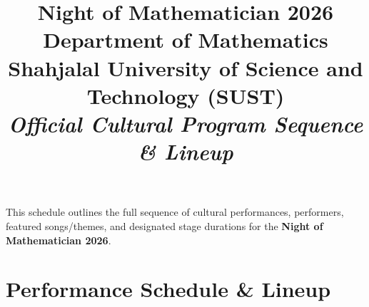 \documentclass[11pt,a4paper]{article}
\title{
    \vspace{-1.5cm}
    \LARGE \textbf{Night of Mathematician 2026} \\
    \large \textbf{Department of Mathematics} \\
    \large \textbf{Shahjalal University of Science and Technology (SUST)} \\[0.3em]
    \normalsize \textit{Official Cultural Program Sequence \& Lineup}
    \vspace{-0.5cm}
}
\date{}
\begin{document}
\maketitle
\thispagestyle{fancy}

\begin{tcolorbox}[colback=blue!5!white,colframe=blue!75!black,title=\textbf{Program Overview}]
This schedule outlines the full sequence of cultural performances, performers, featured songs/themes, and designated stage durations for the \textbf{Night of Mathematician 2026}.
\end{tcolorbox}

\vspace{0.3cm}

\section*{Performance Schedule \& Lineup}
\end{document}
